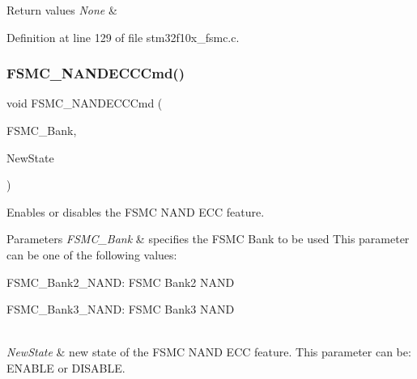 \begin{DoxyRetVals}{Return values}
{\em None} & \\
\hline
\end{DoxyRetVals}


Definition at line 129 of file stm32f10x\+\_\+fsmc.\+c.

\mbox{\label{group___f_s_m_c___private___functions_ga5800301fc39bbe998a18ebd9ff191cdc}} 
\subsubsection{\texorpdfstring{F\+S\+M\+C\+\_\+\+N\+A\+N\+D\+E\+C\+C\+Cmd()}{FSMC\_NANDECCCmd()}}
{\footnotesize\ttfamily void F\+S\+M\+C\+\_\+\+N\+A\+N\+D\+E\+C\+C\+Cmd (\begin{DoxyParamCaption}\item[{uint32\+\_\+t}]{F\+S\+M\+C\+\_\+\+Bank,  }\item[{\hyperlink{group___exported__types_gac9a7e9a35d2513ec15c3b537aaa4fba1}{Functional\+State}}]{New\+State }\end{DoxyParamCaption})}



Enables or disables the F\+S\+MC N\+A\+ND E\+CC feature. 


\begin{DoxyParams}{Parameters}
{\em F\+S\+M\+C\+\_\+\+Bank} & specifies the F\+S\+MC Bank to be used This parameter can be one of the following values\+: \begin{DoxyItemize}
\item F\+S\+M\+C\+\_\+\+Bank2\+\_\+\+N\+A\+ND\+: F\+S\+MC Bank2 N\+A\+ND \item F\+S\+M\+C\+\_\+\+Bank3\+\_\+\+N\+A\+ND\+: F\+S\+MC Bank3 N\+A\+ND \end{DoxyItemize}
\\
\hline
{\em New\+State} & new state of the F\+S\+MC N\+A\+ND E\+CC feature. This parameter can be\+: E\+N\+A\+B\+LE or D\+I\+S\+A\+B\+LE. \\
\hline
\end{DoxyParams}

